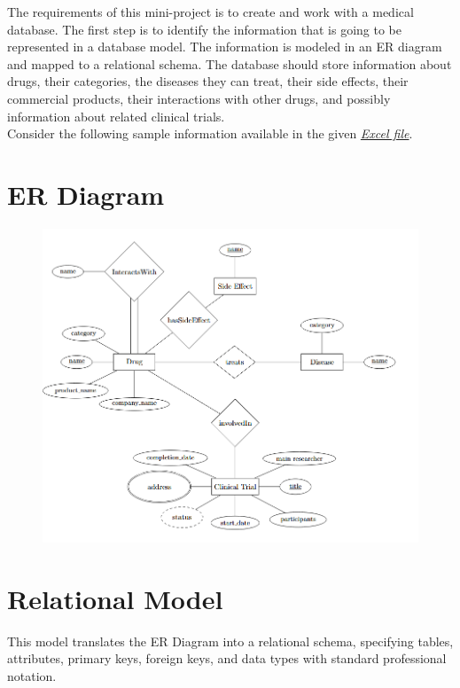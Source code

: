 \documentclass[12pt,a4paper]{article}
\begin{document}
The requirements of this mini-project is to create and work with a medical database. The first step is to identify the information that is going to be represented in a database model. The information is modeled in an ER diagram and mapped to a relational schema.  The database should store information about drugs, their categories, the diseases they can treat, their side effects, their commercial products, their interactions with other drugs, and possibly information about related clinical trials. \\Consider the following sample information available  in the given \href{https://docs.google.com/spreadsheets/d/1DBcLdSKGq2FFMarl1Mj08LblRGRgo8IVbphSGerWoiY/edit?gid=1736641593#gid=1736641593}{\textit{Excel file}}.


\section{ER Diagram}
\begin{figure}[htbp]
    \centering
    \includegraphics[width=1.2\textwidth]{er (1).png}
    \centering
\end{figure}
\newpage

\section{Relational Model}

This model translates the ER Diagram into a relational schema, specifying tables, attributes, primary keys, foreign keys, and data types with standard professional notation.
\end{document}
